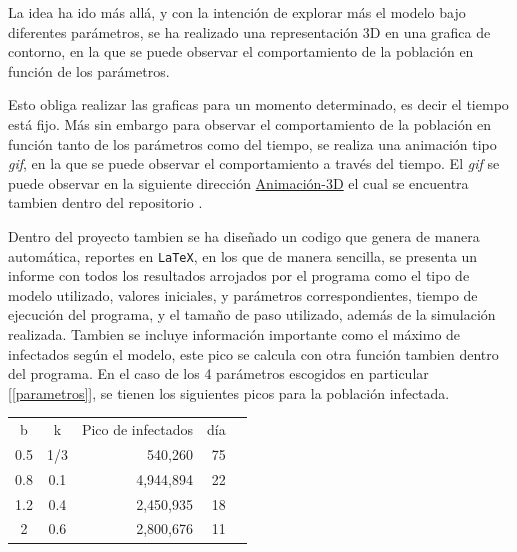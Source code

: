 \documentclass[journal]{IEEEtran}
\begin{document}
\newpage
La idea ha ido más allá, y con la intención de explorar más el modelo bajo diferentes parámetros, se ha realizado
una representación 3D en una grafica de contorno, en la que se puede observar el 
comportamiento de la población en función de los parámetros.

Esto obliga realizar las graficas para un momento determinado, es decir el tiempo está fijo. Más sin embargo
para observar el comportamiento de la población en función tanto de los parámetros como del tiempo, se 
realiza una animación tipo \textit{gif}, en la que se puede observar el comportamiento a través del tiempo. 
El \textit{gif} se puede observar en la siguiente dirección \href{https://github.com/niaggar/propagacion-de-enfermedades-project}{Animación-3D} el cual se encuentra tambien dentro del repositorio \cite{GitHub}.

Dentro del proyecto tambien se ha diseñado un codigo que genera de manera automática, reportes en \texttt{LaTeX}, en los que
de manera sencilla, se presenta un informe con todos los resultados arrojados por el programa como el tipo
de modelo utilizado, valores iniciales, y parámetros correspondientes, tiempo de ejecución del programa, y el tamaño de paso utilizado, además de la simulación realizada. 
Tambien se incluye información importante como el  máximo de infectados según el modelo, este pico se calcula con otra 
función tambien dentro del programa. En el caso de los 4 parámetros escogidos en particular [\ref{parametros}],
se tienen los siguientes picos para la población infectada. \\
\begin{table}[H]
	\centering
	\begin{tabular}{|c|c|r|r|l}
	\cline{1-4}
	b   & k   & \multicolumn{1}{c|}{Pico de infectados} & \multicolumn{1}{c|}{día} &  \\ \cline{1-4}
	0.5 & 1/3 & 540,260                                 & 75                       &  \\ \cline{1-4}
	0.8 & 0.1 & 4,944,894                               & 22                       &  \\ \cline{1-4}
	1.2 & 0.4 & 2,450,935                               & 18                       &  \\ \cline{1-4}
	2   & 0.6 & 2,800,676                               & 11                       &  \\ \cline{1-4}
	\end{tabular}
\end{table}
\end{document}
